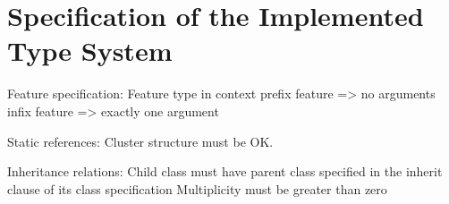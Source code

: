 \chapter{Specification of the Implemented Type System}
\label{appendix-type-system}
Feature specification:
Feature type in context
prefix feature => no arguments
infix feature => exactly one argument

Static references:
Cluster structure must be OK.

Inheritance relations:
Child class must have parent class specified in the inherit clause of its class specification
Multiplicity must be greater than zero